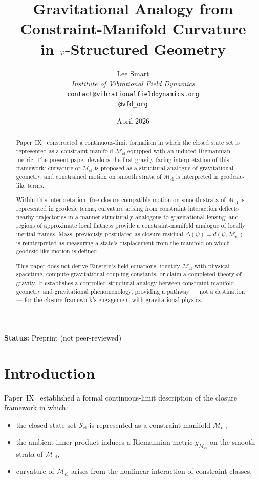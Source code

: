\documentclass[12pt]{article}
\title{Gravitational Analogy from Constraint-Manifold Curvature\\in $\varphi$-Structured Geometry}
\author{%
  Lee Smart\\[4pt]
  \textit{Institute of Vibrational Field Dynamics}\\[2pt]
  \texttt{contact@vibrationalfielddynamics.org}\\[2pt]
  \texttt{@vfd\_org}%
}
\date{April 2026}
\newcommand{\Mcl}{\mathcal{M}_{\mathrm{cl}}}
\newcommand{\Scl}{\mathcal{S}_{\mathrm{cl}}}
\begin{document}
\maketitle

\noindent\textbf{Status:} Preprint (not peer-reviewed)

\begin{abstract}
Paper~IX~\citep{SmartIX} constructed a continuous-limit formalism in which the closed state set is represented as a constraint manifold $\Mcl$ equipped with an induced Riemannian metric. The present paper develops the first gravity-facing interpretation of this framework: curvature of $\Mcl$ is proposed as a structural analogue of gravitational geometry, and constrained motion on smooth strata of $\Mcl$ is interpreted in geodesic-like terms.

Within this interpretation, free closure-compatible motion on smooth strata of $\Mcl$ is represented in geodesic terms; curvature arising from constraint interaction deflects nearby trajectories in a manner structurally analogous to gravitational lensing; and regions of approximate local flatness provide a constraint-manifold analogue of locally inertial frames. Mass, previously postulated as closure residual $\Delta(\psi) = d(\psi, \Mcl)$, is reinterpreted as measuring a state's displacement from the manifold on which geodesic-like motion is defined.

This paper does not derive Einstein's field equations, identify $\Mcl$ with physical spacetime, compute gravitational coupling constants, or claim a completed theory of gravity. It establishes a controlled structural analogy between constraint-manifold geometry and gravitational phenomenology, providing a pathway --- not a destination --- for the closure framework's engagement with gravitational physics.
\end{abstract}

\section{Introduction}\label{sec:intro}

Paper~IX~\citep{SmartIX} established a formal continuous-limit description of the closure framework in which:
\begin{itemize}
    \item the closed state set $\Scl$ is represented as a constraint manifold $\Mcl$,
    \item the ambient inner product induces a Riemannian metric $g_{\Mcl}$ on the smooth strata of $\Mcl$,
    \item curvature of $\Mcl$ arises from the nonlinear interaction of constraint classes.
\end{itemize}
\end{document}
